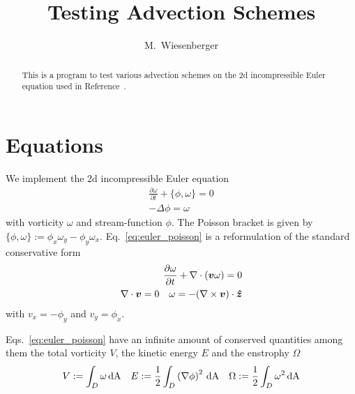 





\title{Testing Advection Schemes}
\author{ M.~Wiesenberger}
\maketitle

\begin{abstract}
  This is a program to test various advection schemes on the 2d incompressible Euler
  equation used in Reference~\cite{Einkemmer2014}.
\end{abstract}

\section{Equations}
We implement the 2d incompressible Euler equation
\begin{subequations}
\begin{align}
 \frac{\partial \omega}{\partial t} + \{ \phi, \omega\} = 0 \\
 -\Delta \phi = \omega \label{eq:euler_poisson_elliptic}
\end{align}
\label{eq:euler_poisson}
\end{subequations}
with vorticity $\omega$ and stream-function $\phi$.
The Poisson bracket is given by $\{ \phi, \omega\} := \phi_x \omega_y - \phi_y \omega_x$.
Eq.~\eqref{eq:euler_poisson} is a reformulation of the standard conservative form
\begin{subequations}
\begin{align}
    \frac{\partial \omega}{\partial t} + \nabla\cdot({{\boldsymbol{v}} \omega}) = 0 \\
\nabla\cdot{\boldsymbol{v}} = 0 \quad \omega = -(\nabla\times {\boldsymbol{v}})\cdot \bm{\hat{z}}
\end{align}
\label{eq:euler_conservative}
\end{subequations}
with $v_x = - \phi_y$ and $v_y = \phi_x$.

Eqs.~\eqref{eq:euler_poisson} have an infinite amount of conserved quantities
among them the total vorticity $V$, the kinetic energy $E$ and the enstrophy $\Omega$
 \begin{align}
     V := \int_D \omega \,\mathrm{dA}\quad
     E :=\frac{1}{2} \int_D \left( \nabla \phi\right)^2 \,\mathrm{dA} \quad
     \Omega:= \frac{1}{2} \int_D \omega^2 \,\mathrm{dA}
 \end{align}


